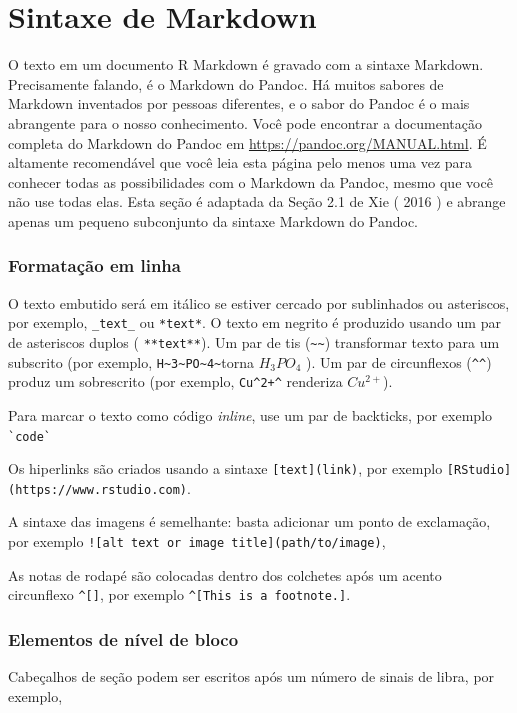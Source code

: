 \documentclass[12pt,a4paper,oneside]{erdc}
\begin{document}
\section{Sintaxe de Markdown}

O texto em um documento R Markdown é gravado com a sintaxe Markdown. Precisamente falando, é o Markdown do Pandoc. Há muitos sabores de Markdown inventados por pessoas diferentes, e o sabor do Pandoc é o mais abrangente para o nosso conhecimento. Você pode encontrar a documentação completa do Markdown do Pandoc em \url{https://pandoc.org/MANUAL.html}. É altamente recomendável que você leia esta página pelo menos uma vez para conhecer todas as possibilidades com o Markdown da Pandoc, mesmo que você não use todas elas. Esta seção é adaptada da Seção 2.1 de Xie ( 2016 ) e abrange apenas um pequeno subconjunto da sintaxe Markdown do Pandoc.

\subsubsection{Formatação em linha}

O texto embutido será em itálico se estiver cercado por sublinhados ou asteriscos, por exemplo, \verb|_text_| ou \verb|*text*|. O texto em negrito é produzido usando um par de asteriscos duplos ( \verb|**text**|). Um par de tis (\verb|~~|) transformar texto para um subscrito (por exemplo, \verb|H~3~PO~4~|torna $H_3 PO_4$ ). Um par de circunflexos (\verb|^^|) produz um sobrescrito (por exemplo, \verb|Cu^2+^| renderiza $Cu^{2+}$).

Para marcar o texto como código \textit{inline}, use um par de backticks, por exemplo \verb|`code`|

Os hiperlinks são criados usando a sintaxe \verb|[text](link)|, por exemplo \verb|[RStudio](https://www.rstudio.com)|. 

A sintaxe das imagens é semelhante: basta adicionar um ponto de exclamação, por exemplo \verb|![alt text or image title](path/to/image)|, 

As notas de rodapé são colocadas dentro dos colchetes após um acento circunflexo \verb|^[]|, por exemplo \verb|^[This is a footnote.]|.


\subsubsection{Elementos de nível de bloco}

Cabeçalhos de seção podem ser escritos após um número de sinais de libra, por exemplo,
\end{document}

